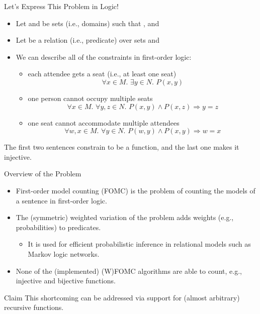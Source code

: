 \documentclass{beamer}
\begin{document}
\begin{frame}{Let's Express This Problem in Logic!}
  \begin{itemize}
  \item Let  and  be sets (i.e., \alert{domains}) such that , and 
  \item Let  be a relation (i.e., \alert{predicate}) over sets  and 
  \item We can describe all of the constraints in first-order logic:
    \begin{itemize}
    \item \pause each attendee gets a seat (i.e., at least one seat)
      \[
      \forall x \in M\text{. }\exists y \in N\text{. }P(x, y)
      \]
    \item \pause one person cannot occupy multiple seats
      \[
      \forall x \in M\text{. }\forall y, z \in N\text{. }P(x, y) \land P(x, z) \Rightarrow y=z
      \]
    \item \pause one seat cannot accommodate multiple attendees
      \[
      \forall w, x \in M\text{. }\forall y \in N\text{. }P(w, y) \land P(x, y) \Rightarrow w=x
      \]
    \end{itemize}
  \end{itemize}
  \pause
  The first two sentences constrain  to be a function, and the last one makes it injective.
\end{frame}

\begin{frame}{Overview of the Problem}
  \begin{itemize}
    \item \alert{First-order model counting} (FOMC) is the problem of counting
          the models of a sentence in first-order logic.
    \item The \alert{(symmetric) weighted} variation of the problem adds weights
          (e.g., probabilities) to predicates.
          \begin{itemize}
            \item It is used for efficient \alert{probabilistic inference} in
                  relational models such as Markov logic networks.
          \end{itemize}
    \item None of the (implemented) (W)FOMC algorithms are able to count, e.g.,
          \alert{injective} and \alert{bijective} functions.
  \end{itemize}
  \begin{block}{Claim}
    This shortcoming can be addressed via support for (almost arbitrary)
    \alert{recursive functions}.
  \end{block}
\end{frame}
\end{document}
